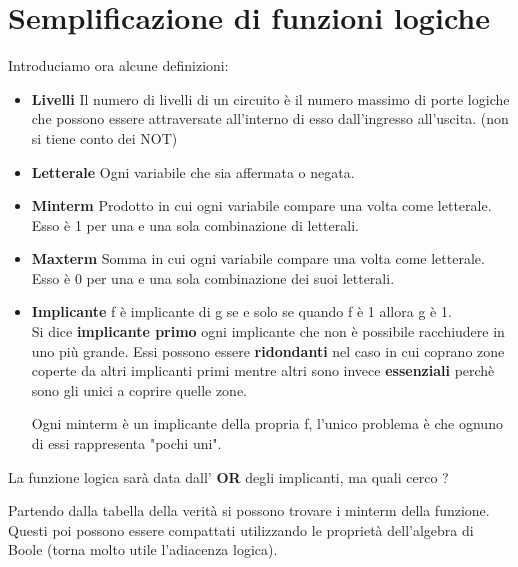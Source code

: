 \documentclass[a4paper]{book}
\begin{document}
\chapter{Semplificazione di funzioni logiche}
Introduciamo ora alcune definizioni:\\
\begin{itemize}
\item\textbf{Livelli}
Il numero di livelli di un circuito è il numero massimo di porte logiche che possono essere attraversate all'interno di esso dall'ingresso all'uscita.
(non si tiene conto dei NOT)
\item\textbf{Letterale}
Ogni variabile che sia affermata o negata.\\
\item\textbf{Minterm}
Prodotto in cui ogni variabile compare una volta come letterale.\\ Esso è 1 per una e una sola combinazione di letterali.\\
\item\textbf{Maxterm}
Somma in cui ogni variabile compare una volta come letterale.\\ Esso è 0 per una e una sola combinazione dei suoi letterali.\\
\item\textbf{Implicante}
f è implicante di g se e solo se quando f è 1 allora g è 1.
\vspace{\baselineskip}
\\ Si dice \textbf{implicante primo} ogni implicante che non è possibile racchiudere in uno più grande.
Essi possono essere \textbf{ridondanti} nel caso in cui coprano zone coperte da altri implicanti primi mentre altri sono invece \textbf{essenziali} perchè sono gli unici a coprire quelle zone.

\vspace{\baselineskip}
\newpage
Ogni minterm è un implicante della propria f, l'unico problema è che ognuno di essi rappresenta "pochi uni".\\\break
\end{itemize}

La funzione logica sarà data dall' \textbf{OR} degli implicanti, ma quali cerco ?
\vspace{\baselineskip}

Partendo dalla tabella della verità si possono trovare i minterm della funzione.\\Questi poi possono essere compattati utilizzando le proprietà dell'algebra di Boole (torna molto utile l'adiacenza logica).
\end{document}
